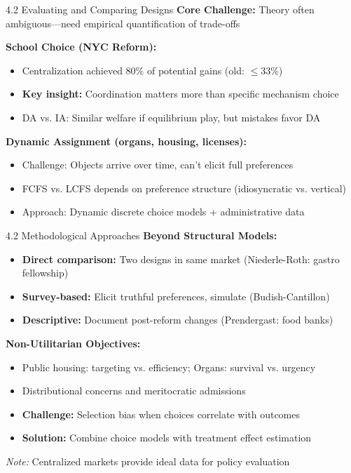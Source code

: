 \documentclass{beamer}
\begin{document}
\begin{frame}{4.2 Evaluating and Comparing Designs}
\textbf{Core Challenge:} Theory often ambiguous—need empirical quantification of trade-offs

\vspace{0.3cm}
\textbf{School Choice (NYC Reform):}
\begin{itemize}
    \item Centralization achieved 80\% of potential gains (old: $\leq 33\%$)
    \item \textbf{Key insight:} Coordination matters more than specific mechanism choice
    \item DA vs. IA: Similar welfare if equilibrium play, but mistakes favor DA
\end{itemize}

\vspace{0.3cm}
\textbf{Dynamic Assignment (organs, housing, licenses):}
\begin{itemize}
    \item Challenge: Objects arrive over time, can't elicit full preferences
    \item FCFS vs. LCFS depends on preference structure (idiosyncratic vs. vertical)
    \item Approach: Dynamic discrete choice models + administrative data
\end{itemize}
\end{frame}

\begin{frame}{4.2 Methodological Approaches}
\textbf{Beyond Structural Models:}
\begin{itemize}
    \item \textbf{Direct comparison:} Two designs in same market (Niederle-Roth: gastro fellowship)
    \item \textbf{Survey-based:} Elicit truthful preferences, simulate (Budish-Cantillon)
    \item \textbf{Descriptive:} Document post-reform changes (Prendergast: food banks)
\end{itemize}

\vspace{0.3cm}
\textbf{Non-Utilitarian Objectives:}
\begin{itemize}
    \item Public housing: targeting vs. efficiency; Organs: survival vs. urgency
    \item Distributional concerns and meritocratic admissions
    \item \textbf{Challenge:} Selection bias when choices correlate with outcomes
    \item \textbf{Solution:} Combine choice models with treatment effect estimation
\end{itemize}

\vspace{0.3cm}
\textit{Note:} Centralized markets provide ideal data for policy evaluation
\end{frame}
\end{document}
